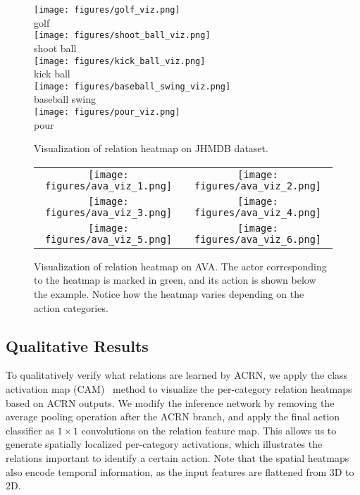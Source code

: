 \documentclass[runningheads]{llncs}
\begin{document}
\begin{figure}
\centering
\texttt{[image: figures/golf\_viz.png]}
\\
golf
\\
\texttt{[image: figures/shoot\_ball\_viz.png]}
\\
shoot ball
\\
\texttt{[image: figures/kick\_ball\_viz.png]}
\\
kick ball
\\
\texttt{[image: figures/baseball\_swing\_viz.png]}
\\
baseball swing
\\
\texttt{[image: figures/pour\_viz.png]}
\\
pour
\\
\caption{Visualization of relation heatmap on JHMDB dataset.}
\label{fig:viz_cam}
\end{figure}

\begin{figure}
\begin{center}
\begin{tabular}{cc}
\texttt{[image: figures/ava\_viz\_1.png]}&
\texttt{[image: figures/ava\_viz\_2.png]}\\
\texttt{[image: figures/ava\_viz\_3.png]}&
\texttt{[image: figures/ava\_viz\_4.png]}\\
\texttt{[image: figures/ava\_viz\_5.png]}&
\texttt{[image: figures/ava\_viz\_6.png]}\\
\end{tabular}
\end{center}
\caption{Visualization of relation heatmap on AVA. The actor corresponding to the heatmap is marked in green, and its action is shown below the example. Notice how the heatmap varies depending on the action categories.}
\label{fig:ava_viz}
\end{figure}

\subsection{Qualitative Results}

To qualitatively verify what relations are learned by ACRN, we apply the class activation map (CAM)~\cite{zhou2016cvpr_cam} method to visualize the per-category relation heatmaps based on ACRN outputs. We modify the inference network by removing the average pooling operation after the ACRN branch, and apply the final action classifier as $1\times 1$ convolutions on the relation feature map. This allows us to generate spatially localized per-category activations, which illustrates the relations important to identify a certain action. Note that the spatial heatmaps also encode temporal information, as the input features are flattened from 3D to 2D.
\end{document}

